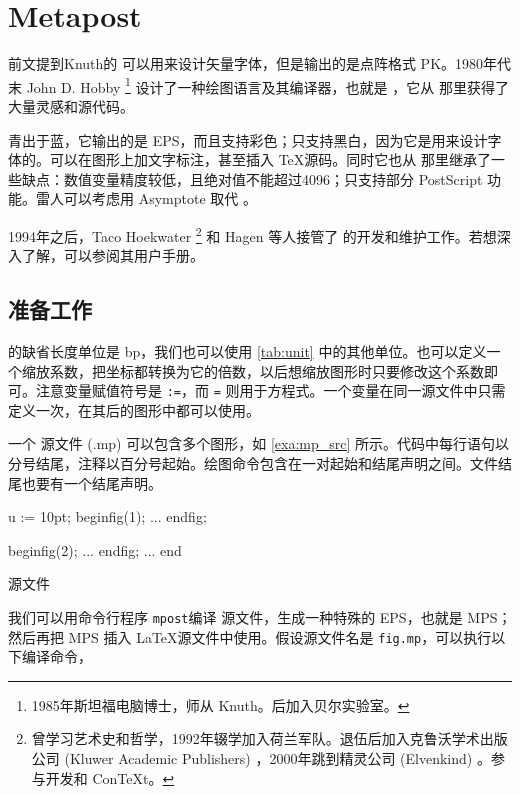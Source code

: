 \chapter{Metapost}
\label{sec:mp}

前文提到Knuth的 \MF 可以用来设计矢量字体，但是输出的是点阵格式 PK。1980年代末 John D. Hobby\indexHobby{} \footnote{1985年斯坦福电脑博士，师从 Knuth。后加入贝尔实验室。} 设计了一种绘图语言及其编译器，也就是 \MP ，它从 \MF 那里获得了大量灵感和源代码。

\MP 青出于蓝，它输出的是 EPS，而且支持彩色；\MF 只支持黑白，因为它是用来设计字体的。\MP 可以在图形上加文字标注，甚至插入 \TeX 源码。同时它也从 \MF 那里继承了一些缺点：数值变量精度较低，且绝对值不能超过4096；只支持部分 PostScript 功能。雷人可以考虑用 Asymptote 取代 \MP。

1994年之后，Taco Hoekwater\indexHoekwater{} \footnote{曾学习艺术史和哲学，1992年辍学加入荷兰军队。退伍后加入克鲁沃学术出版公司 (Kluwer Academic Publishers) ，2000年跳到精灵公司 (Elvenkind) 。参与开发\LuaTeX{}和 Con\TeX t。} 和 Hagen 等人接管了 \MP 的开发和维护工作。若想深入了解，可以参阅其用户手册\citep{Hobby_metapost}。

\section{准备工作}

\MP 的缺省长度单位是 bp，我们也可以使用 \autoref{tab:unit} 中的其他单位。也可以定义一个缩放系数，把坐标都转换为它的倍数，以后想缩放图形时只要修改这个系数即可。注意变量赋值符号是 \texttt{:=}，而 \texttt{=} 则用于方程式。一个变量在同一源文件中只需定义一次，在其后的图形中都可以使用。

一个 \MP 源文件 (.mp) 可以包含多个图形，如 \autoref{exa:mp_src} 所示。代码中每行语句以分号结尾，注释以百分号起始。绘图命令包含在一对起始和结尾声明之间。文件结尾也要有一个结尾声明。

\begin{example}[h]
\begin{Code}[numbers=left]
u := 10pt;   %
beginfig(1); %
...          %
endfig;      %

beginfig(2);
...
endfig;
...
end          %
\end{Code}
\caption{\MP 源文件}
\label{exa:mp_src}
\end{example}

我们可以用命令行程序 \texttt{mpost}编译 \MP 源文件，生成一种特殊的 EPS，也就是 MPS；然后再把 MPS 插入 \LaTeX 源文件中使用。假设源文件名是 \texttt{fig.mp}，可以执行以下编译命令，

